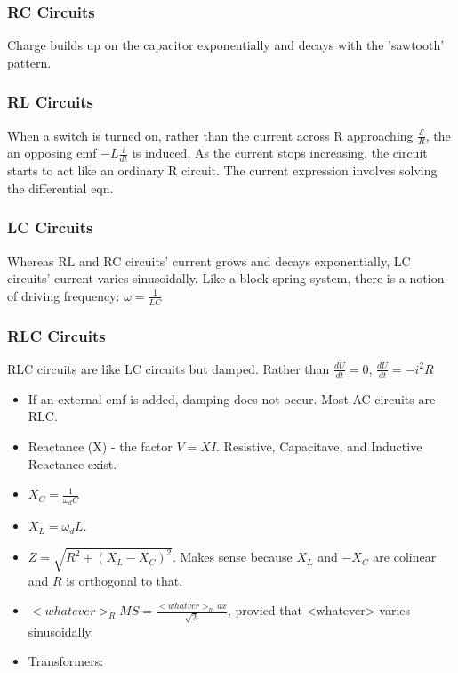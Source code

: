 \documentclass{article}
\begin{document}
        \subsubsection*{RC Circuits}
        Charge builds up on the capacitor exponentially and decays with the 'sawtooth' pattern.
        \subsubsection*{RL Circuits}
        When a switch is turned on, rather than the current across R approaching $\frac{\mathscr{E}}{R}$, the
        an opposing emf $-L \frac{i}{dt}$ is induced. As the current stops increasing, the circuit
        starts to act like an ordinary R circuit. The current expression involves solving the differential eqn.
        \subsubsection*{LC Circuits}
        Whereas RL and RC circuits' current grows and decays exponentially, LC circuits' current varies sinusoidally.
        Like a block-spring system, there is a notion of driving frequency: $\omega = \frac{1}{LC}$
        \subsubsection*{RLC Circuits}
        RLC circuits are like LC circuits but damped. Rather than $\frac{dU}{dt} = 0$, $\frac{dU}{dt} = - i^2 R $
        \begin{itemize}[leftmargin=\lindent]
        \item If an external emf is added, damping does not occur. Most AC circuits are RLC.
        \item Reactance (X) - the factor $V = X I$. Resistive, Capacitave, and Inductive Reactance exist.
        \item $X_C = \frac{1}{\omega_d C}$
        \item $X_L = \omega_d L$.
        \item $Z = \sqrt{R^2 + (X_L - X_C)^2}$. Makes sense because $X_L$ and $- X_C$ are colinear and $R$ is
        orthogonal to that. 
        \item $<whatever>_RMS = \frac{<whatver>_max}{\sqrt{2}}$, provied that <whatever> varies sinusoidally.
        \item Transformers: 
        \end{itemize}
\end{document}
